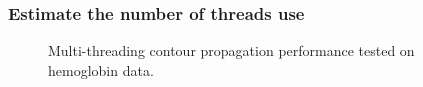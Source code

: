 \documentclass[8pt]{beamer}
\begin{document}
\begin{frame}
  \frametitle{Estimate the number of threads use %
  }
  \begin{figure}[h!]
    \centering
    \caption[Multi-threading Contour Propagation Performance]
    {Multi-threading contour propagation performance tested on hemoglobin data.
    }
    \label{fig:threading1}
  \end{figure}
\end{frame}
\note{}

\end{document}
